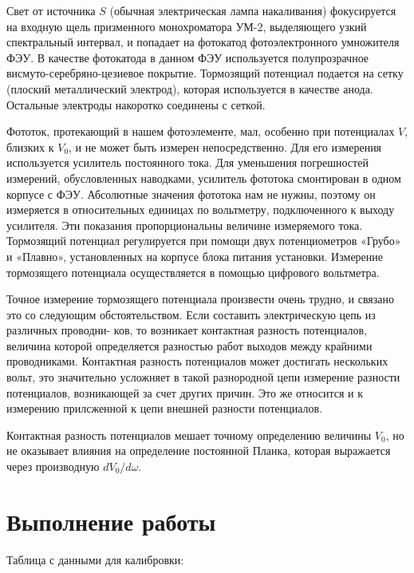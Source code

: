 \documentclass[a4paper, 12pt]{article}
\begin{document}
Свет от источника $S$ (обычная электрическая лампа накаливания) фокусируется на входную щель призменного монохроматора УМ-2, выделяющего узкий спектральный интервал, и попадает на фотокатод фотоэлектронного умножителя ФЭУ. В качестве фотокатода в данном
ФЭУ используется полупрозрачное висмуто-серебряно-цезиевое покрытие. Тормозящий потенциал подается на сетку (плоский металлический электрод), которая используется в качестве анода. Остальные электроды накоротко соединены с сеткой.

Фототок, протекающий в нашем фотоэлементе, мал, особенно при потенциалах $V$, близких к $V_0$, и не может быть измерен непосредственно. Для его измерения используется усилитель постоянного тока. Для уменьшения погрешностей измерений, обусловленных наводками, усилитель фототока смонтирован в одном корпусе с ФЭУ. 
Абсолютные значения фототока нам не нужны, поэтому он измеряется в относительных единицах по вольтметру, подключенного к выходу усилителя. Эти показания пропорциональны величине измеряемого тока. Тормозящий потенциал регулируется при помощи двух потенциометров «Грубо» и «Плавно», установленных на корпусе блока питания установки. Измерение тормозящего потенциала осуществляется в помощью цифрового вольтметра.


Точное измерение тормозящего потенциала произвести очень трудно, и связано это со следующим обстоятельством. Если составить электрическую цепь из различных проводни-
ков, то возникает контактная разность потенциалов, величина которой определяется разностью работ выходов между крайними проводниками. Контактная разность потенциалов может достигать нескольких вольт, это значительно усложняет в такой разнородной цепи измерение разности потенциалов, возникающей за счет других причин. Это же относится и к измерению прилсженной к цепи внешней разности потенциалов.

Контактная разность потенциалов мешает точному определению величины $V_0$, но не оказывает влияния на определение постоянной Планка, которая выражается через производную $d V_0 / d \omega$.
\section{Выполнение работы}
Таблица с данными для калибровки:
\end{document}
